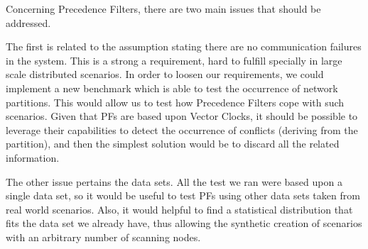 Concerning Precedence Filters, there are two main issues that should be
addressed.

The first is related to the assumption stating there are
no communication failures in the system. This is a strong a requirement,
hard to fulfill specially in large scale distributed scenarios.  In
order to loosen our requirements, we could implement a new benchmark which is
able to test the occurrence of network partitions.  This would allow
us to test how Precedence Filters cope with such scenarios. Given that
PFs are based upon Vector Clocks, it should be possible to leverage
their capabilities to detect the occurrence of conflicts (deriving
from the partition), and then the simplest solution would be to discard
all the related information.

The other issue pertains the data sets. All the test we
ran were based upon a single data set, so it would be useful to test
PFs using other data sets taken from real world scenarios. Also, it would
helpful to find a statistical distribution that fits the data set we
already have, thus allowing the synthetic creation of scenarios with
an arbitrary number of scanning nodes.


